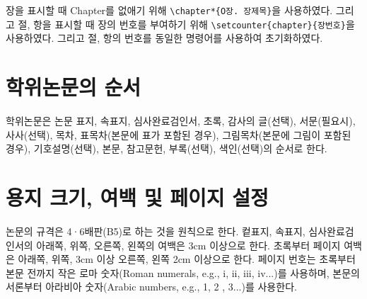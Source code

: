 


장을 표시할 때 Chapter를 없애기 위해 \verb|\chapter*{O장. 장제목}|을 사용하였다. 그리고 절, 항을 표시할 때 장의 번호를 부여하기 위해 \verb|\setcounter{chapter}{장번호}|을 사용하였다. 그리고 절, 항의 번호를 동일한 명령어를 사용하여 초기화하였다.\par

\section{학위논문의 순서} \label{sec:order}

학위논문은 논문 표지, 속표지, 심사완료검인서, 초록, 감사의 글(선택), 서문(필요시), 사사(선택), 목차, 표목차(본문에 표가 포함된 경우), 그림목차(본문에 그림이 포함된 경우), 기호설명(선택), 본문, 참고문헌, 부록(선택), 색인(선택)의 순서로 한다.

\section{용지 크기, 여백 및 페이지 설정} \label{sec:papersize}
논문의 규격은 4·6배판(B5)로 하는 것을 원칙으로 한다. 컽표지, 속표지, 심사완료검인서의 아래쪽, 위쪽, 오른쪽, 왼쪽의 여백은 3cm 이상으로 한다. 초록부터 페이지 여백은 아래쪽, 위쪽, 3cm 이상 오른쪽, 왼쪽 2cm 이상으로 한다. 페이지 번호는 초록부터 본문 전까지 작은 로마 숫자(Roman numerals, e.g., i, ii, iii, iv...)를 사용하며, 본문의 서론부터 아라비아 숫자(Arabic numbers, e.g., 1, 2 , 3...)를 사용한다. 


